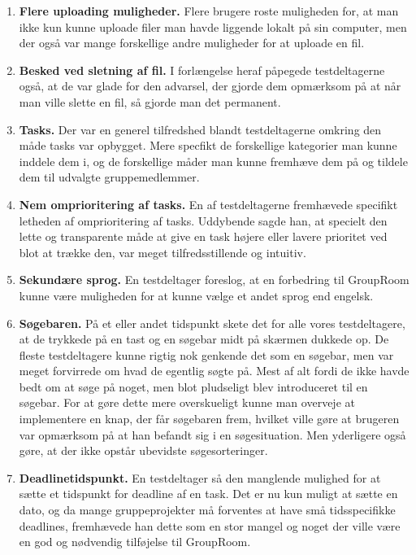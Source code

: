 \documentclass[12pt]{article}
\begin{document}
\begin{enumerate}
  \item \textbf{Flere uploading muligheder.} Flere brugere roste muligheden for, at man ikke kun kunne uploade filer man havde liggende lokalt på sin computer, men der også var mange forskellige andre muligheder for at uploade en fil.
  
  \item \textbf{Besked ved sletning af fil.} I forlængelse heraf påpegede testdeltagerne også, at de var glade for den advarsel, der gjorde dem opmærksom på at når man ville slette en fil, så gjorde man det permanent.
  
  \item \textbf{Tasks.} Der var en generel tilfredshed blandt testdeltagerne omkring den måde tasks var opbygget. Mere specfikt de forskellige kategorier man kunne inddele dem i, og de forskellige måder man kunne fremhæve dem på og tildele dem til udvalgte gruppemedlemmer.
  
  \item \textbf{Nem omprioritering af tasks.} En af testdeltagerne fremhævede specifikt letheden af omprioritering af tasks. Uddybende sagde han, at specielt den lette og transparente måde at give en task højere eller lavere prioritet ved blot at trække den, var meget tilfredsstillende og intuitiv.

  \item \textbf{Sekundære sprog.} En testdeltager foreslog, at en forbedring til GroupRoom kunne være muligheden for at kunne vælge et andet sprog end engelsk.
    
  \item \textbf{Søgebaren.} På et eller andet tidspunkt skete det for alle vores testdeltagere, at de trykkede på en tast og en søgebar midt på skærmen dukkede op. De fleste testdeltagere kunne rigtig nok genkende det som en søgebar, men var meget forvirrede om hvad de egentlig søgte på. Mest af alt fordi de ikke havde bedt om at søge på noget, men blot pludseligt blev introduceret til en søgebar. For at gøre dette mere overskueligt kunne man overveje at implementere en knap, der får søgebaren frem, hvilket ville gøre at brugeren var opmærksom på at han befandt sig i en søgesituation. Men yderligere også gøre, at der ikke opstår ubevidste søgesorteringer.  

  \item \textbf{Deadlinetidspunkt.} En testdeltager så den manglende mulighed for at sætte et tidspunkt for deadline af en task. Det er nu kun muligt at sætte en dato, og da mange gruppeprojekter må forventes at have små tidsspecifikke deadlines, fremhævede han dette som en stor mangel og noget der ville være en god og nødvendig tilføjelse til GroupRoom.


\end{enumerate}
\end{document}
